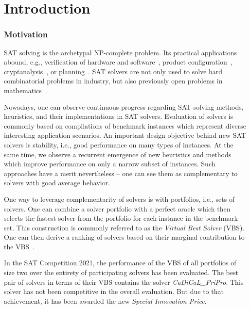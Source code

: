 \documentclass[runningheads]{llncs}
\begin{document}
\section{Introduction}
\label{sec:introduction}

\subsubsection{Motivation}

SAT solving is the archetypal NP-complete problem.
Its practical applications abound, e.g., verification of hardware and software~\cite{Kaufmann:2021:Amulet,Buning:2020:QPRVerify}, product configuration~\cite{Janota:2014:Configuration}, cryptanalysis~\cite{Nejati:2020:CDCLCrypto}, or planning~\cite{Schreiber:2021:Lilotane}.
SAT solvers are not only used to solve hard combinatorial problems in industry, but also previously open problems in mathematics~\cite{Heule:2016:Pyth,Heule:2018:Schur}. 

Nowadays, one can observe continuous progress regarding SAT solving methods, heuristics, and their implementations in SAT solvers. 
Evaluation of solvers is commonly based on compilations of benchmark instances which represent diverse interesting application scenarios. 
An important design objective behind new SAT solvers is stability, i.e., good performance on many types of instances. 
At the same time, we observe a recurrent emergence of new heuristics and methods which improve performance on only a narrow subset of instances. 
Such approaches have a merit nevertheless -- one can see them as complementary to solvers with good average behavior. 

One way to leverage complementarity of solvers is with portfolios, i.e., sets of solvers.
One can combine a solver portfolio with a perfect oracle which then selects the fastest solver from the portfolio for each instance in the benchmark set. 
This construction is commonly referred to as the \emph{Virtual Best Solver} (VBS). 
One can then derive a ranking of solvers based on their marginal contribution to the VBS~\cite{Xu:2012:EvalContribVBS}. 

\begin{example}
In the SAT Competition 2021, the performance of the VBS of all portfolios of size two over the entirety of participating solvers has been evaluated. 
The best pair of solvers in terms of their VBS contains the solver \emph{CaDiCaL\_PriPro}.
This solver has not been competitive in the overall evaluation.
But due to that achievement, it has been awarded the new \emph{Special Innovation Price}.
\end{example}
\end{document}

